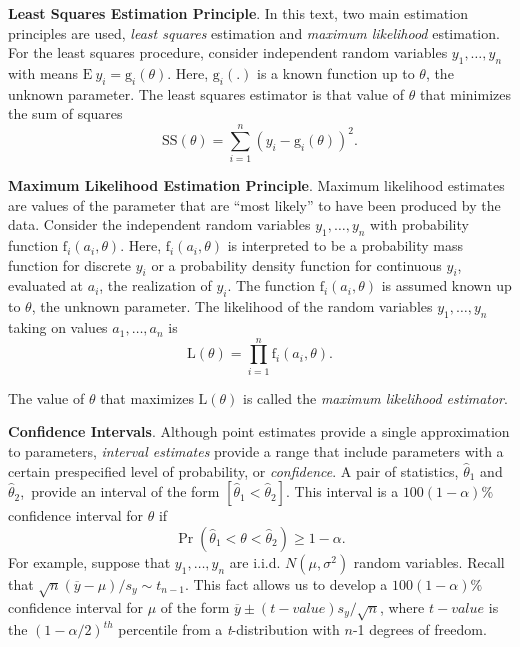 
\textbf{Least Squares Estimation Principle}. In this text, two main
estimation principles are used, \emph{least squares} estimation and
\emph{maximum likelihood} estimation. For the least squares
procedure, consider independent random variables  $y_1,\ldots,y_n$
with means $\mathrm{E~}y_i= \mathrm{g}_i(\theta )$. Here,
$\mathrm{g}_i(.)$ is a known function up to $\theta $, the unknown
parameter. The least squares estimator is that value of $\theta $
that minimizes the sum of squares
\begin{equation*}
\mathrm{SS}(\theta )=\sum_{i=1}^n\left( y_i-\mathrm{g}_i(\theta
)\right) ^2.
\end{equation*}


\textbf{Maximum Likelihood Estimation Principle}. Maximum likelihood
estimates are values of the parameter that are ``most likely'' to
have been produced by the data. Consider the independent random
variables $y_1,\ldots,y_n$ with probability function $
\mathrm{f}_i(a_i,\theta )$. Here, $\mathrm{f}_i(a_i,\theta )$ is
interpreted to be a probability mass function for discrete $y_i$ or
a probability density function for continuous $y_i$, evaluated at
$a_i$, the realization of $y_i$. The function
$\mathrm{f}_i(a_i,\theta )$ is assumed known up to $\theta $, the
unknown parameter. The likelihood of the random variables
$y_1,\ldots,y_n$ taking on values $a_1,\ldots,a_n$ is
\begin{equation*}
\mathrm{L}(\theta )=\prod\limits_{i=1}^n \mathrm{f}_i(a_i,\theta ).
\end{equation*}

The value of $\theta $ that maximizes $\mathrm{L}(\theta )$ is
called the \emph{maximum likelihood
estimator}.

\textbf{Confidence Intervals}. Although point estimates provide a
single approximation to parameters, \emph{interval estimates}
provide a range that include parameters with a certain prespecified
level of probability, or \emph{confidence}. A pair of statistics,
$\widehat{\theta }_1$ and $ \widehat{\theta }_{2}$,\ provide an
interval of the form $\left[ \widehat{ \theta }_1<\widehat{\theta
}_{2}\right] $. This interval is a $ 100(1-\alpha )\%$ confidence
interval for $\theta $ if
\begin{equation*}
\Pr \left( \widehat{\theta }_1<\theta <\widehat{\theta }_{2}\right)
\geq 1-\alpha .
\end{equation*}
For example, suppose that $y_1,\ldots,y_n$ are i.i.d. $N(\mu ,\sigma
^2)$ random variables. Recall that $\sqrt{n}\left( \overline{y}-\mu
\right) /s_y\sim t_{n-1}$. This fact allows us to develop a
$100(1-\alpha )\%$ confidence interval for $\mu $ of the form
$\overline{y}\pm (t-value)s_y/ \sqrt{n}$, where $t-value$ is the
$(1-\alpha /2)^{th}$ percentile from a \textit{t}-distribution with
$n$-1 degrees of freedom.


